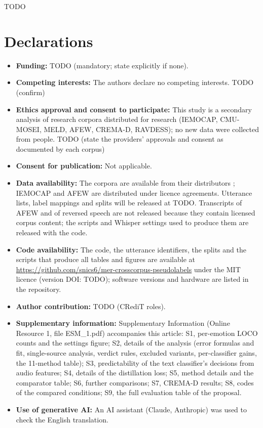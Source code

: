 \documentclass[sn-nature,pdflatex]{sn-jnl}
\begin{document}
\backmatter

TODO

\section*{Declarations}

\begin{itemize}
\item \textbf{Funding:} TODO (mandatory; state explicitly if none).
\item \textbf{Competing interests:} The authors declare no competing interests. TODO (confirm)
\item \textbf{Ethics approval and consent to participate:} This study is a secondary analysis of research corpora distributed for research (IEMOCAP, CMU-MOSEI, MELD, AFEW, CREMA-D, RAVDESS); no new data were collected from people. TODO (state the providers' approvals and consent as documented by each corpus)
\item \textbf{Consent for publication:} Not applicable.
\item \textbf{Data availability:} The corpora are available from their distributors \cite{busso2008iemocap,zadeh2018mosei,poria2019meld,dhall2012afew,cao2014cremad,livingstone2018ravdess}; IEMOCAP and AFEW are distributed under licence agreements. Utterance lists, label mappings and splits will be released at TODO. Transcripts of AFEW and of reversed speech are not released because they contain licensed corpus content; the scripts and Whisper settings used to produce them are released with the code.
\item \textbf{Code availability:} The code, the utterance identifiers, the splits and the scripts that produce all tables and figures are available at \url{https://github.com/snics6/mer-crosscorpus-pseudolabels} under the MIT licence (version DOI: TODO); software versions and hardware are listed in the repository.
\item \textbf{Author contribution:} TODO (CRediT roles).
\item \textbf{Supplementary information:} Supplementary Information (Online Resource 1, file ESM\_1.pdf) accompanies this article: S1, per-emotion LOCO counts and the settings figure; S2, details of the analysis (error formulas and fit, single-source analysis, verdict rules, excluded variants, per-classifier gains, the 11-method table); S3, predictability of the text classifier's decisions from audio features; S4, details of the distillation loss; S5, method details and the comparator table; S6, further comparisons; S7, CREMA-D results; S8, codes of the compared conditions; S9, the full evaluation table of the proposal.
\item \textbf{Use of generative AI:} An AI assistant (Claude, Anthropic) was used to check the English translation.
\end{itemize}




\end{document}
